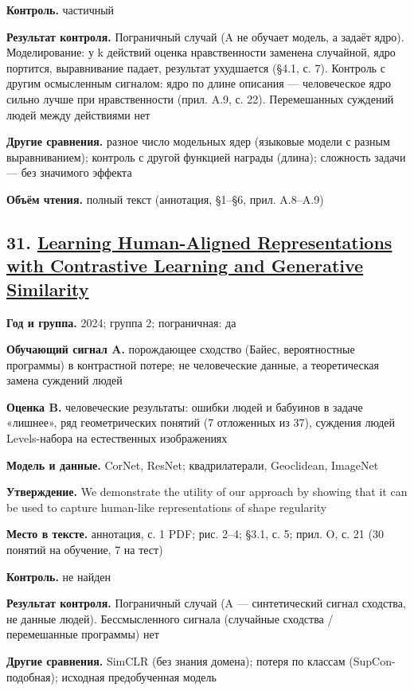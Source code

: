 \textbf{Контроль.} частичный

\textbf{Результат контроля.} Пограничный случай (A не обучает модель, а задаёт ядро). Моделирование: у k действий оценка нравственности заменена случайной, ядро портится, выравнивание падает, результат ухудшается (§4.1, с. 7). Контроль с другим осмысленным сигналом: ядро по длине описания — человеческое ядро сильно лучше при нравственности (прил. A.9, с. 22). Перемешанных суждений людей между действиями нет

\textbf{Другие сравнения.} разное число модельных ядер (языковые модели с разным выравниванием); контроль с другой функцией награды (длина); сложность задачи — без значимого эффекта

\textbf{Объём чтения.} полный текст (аннотация, §1–§6, прил. A.8–A.9)


\subsection*{31. \href{https://doi.org/10.48550/arxiv.2405.19420}{Learning Human-Aligned Representations with Contrastive Learning and Generative Similarity}}

\textbf{Год и группа.} 2024; группа 2; пограничная: да

\textbf{Обучающий сигнал A.} порождающее сходство (Байес, вероятностные программы) в контрастной потере; не человеческие данные, а теоретическая замена суждений людей

\textbf{Оценка B.} человеческие результаты: ошибки людей и бабуинов в задаче «лишнее», ряд геометрических понятий (7 отложенных из 37), суждения людей Levels-набора на естественных изображениях

\textbf{Модель и данные.} CorNet, ResNet; квадрилатерали, Geoclidean, ImageNet

\textbf{Утверждение.} We demonstrate the utility of our approach by showing that it can be used to capture human-like representations of shape regularity

\textbf{Место в тексте.} аннотация, с. 1 PDF; рис. 2–4; §3.1, с. 5; прил. O, с. 21 (30 понятий на обучение, 7 на тест)

\textbf{Контроль.} не найден

\textbf{Результат контроля.} Пограничный случай (A — синтетический сигнал сходства, не данные людей). Бессмысленного сигнала (случайные сходства / перемешанные программы) нет

\textbf{Другие сравнения.} SimCLR (без знания домена); потеря по классам (SupCon-подобная); исходная предобученная модель

